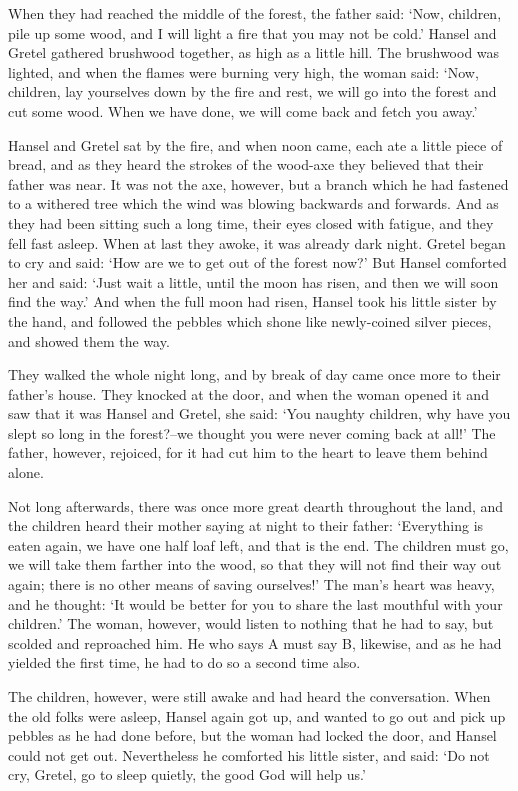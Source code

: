 \documentclass[oneside,11pt]{memoir} %
\begin{document}
	When they had reached the middle of the forest, the father said: `Now, children, pile up some wood, and I will light a fire that you may not be cold.' Hansel and Gretel gathered brushwood together, as high as a little hill. The brushwood was lighted, and when the flames were burning very high, the woman said: `Now, children, lay yourselves down by the fire and rest, we will go into the forest and cut some wood. When we have done, we will come back and fetch you away.'
	
	Hansel and Gretel sat by the fire, and when noon came, each ate a little piece of bread, and as they heard the strokes of the wood-axe they believed that their father was near. It was not the axe, however, but a branch which he had fastened to a withered tree which the wind was blowing backwards and forwards. And as they had been sitting such a long time, their eyes closed with fatigue, and they fell fast asleep. When at last they awoke, it was already dark night. Gretel began to cry and said: `How are we to get out of the forest now?' But Hansel comforted her and said: `Just wait a little, until the moon has risen, and then we will soon find the way.' And when the full moon had risen, Hansel took his little sister by the hand, and followed the pebbles which shone like newly-coined silver pieces, and showed them the way.
	
	They walked the whole night long, and by break of day came once more to their father's house. They knocked at the door, and when the woman opened it and saw that it was Hansel and Gretel, she said: `You naughty children, why have you slept so long in the forest?--we thought you were never coming back at all!' The father, however, rejoiced, for it had cut him to the heart to leave them behind alone.
	
	Not long afterwards, there was once more great dearth throughout the land, and the children heard their mother saying at night to their father: `Everything is eaten again, we have one half loaf left, and that is the end. The children must go, we will take them farther into the wood, so that they will not find their way out again; there is no other means of saving ourselves!' The man's heart was heavy, and he thought: `It would be better for you to share the last mouthful with your children.' The woman, however, would listen to nothing that he had to say, but scolded and reproached him. He who says A must say B, likewise, and as he had yielded the first time, he had to do so a second time also.
	
	The children, however, were still awake and had heard the conversation. When the old folks were asleep, Hansel again got up, and wanted to go out and pick up pebbles as he had done before, but the woman had locked the door, and Hansel could not get out. Nevertheless he comforted his little sister, and said: `Do not cry, Gretel, go to sleep quietly, the good God will help us.'
	
\end{document}
